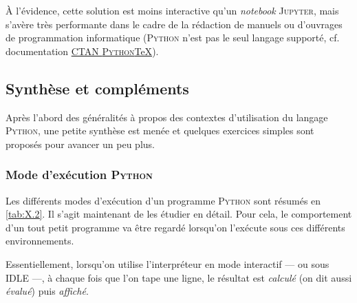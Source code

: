 À l'évidence, cette solution est moins interactive qu'un \textit{notebook} \textsc{Jupyter}, mais s'avère très performante dans le cadre de la rédaction de manuels ou d'ouvrages de programmation informatique (\textsc{Python} n'est pas le seul langage supporté, cf. documentation \href{https://ctan.org/pkg/pythontex}{CTAN \textsc{Python}\TeX}).


\subsection[Synthèse et compléments]{Synthèse et compléments}
\label{sub:X.1.4}

Après l'abord des généralités à propos des contextes d'utilisation du langage \textsc{Python}, une petite synthèse est menée et quelques exercices simples sont proposés pour avancer un peu plus.


\subsubsection[Modes d'exécution \textsc{Python}]{Mode d'exécution \textsc{Python}}
\label{subsub:X.1.4.1}

Les différents modes d'exécution d'un programme \textsc{Python} sont résumés en \cref{tab:X.2}. Il s'agit maintenant de les étudier en détail. Pour cela, le comportement d'un tout petit programme va être regardé lorsqu'on l'exécute sous ces différents environnements.


Essentiellement, lorsqu'on utilise l'interpréteur en mode interactif --- ou sous IDLE ---, à chaque fois que l'on tape une ligne, le résultat est \emph{calculé} (on dit aussi \emph{évalué}) puis \emph{affiché}.

